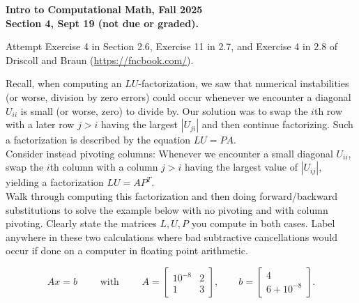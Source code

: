 \documentclass[11pt]{article}
\begin{document}
\begin{center}
{\bf Intro to Computational Math, Fall 2025\\
Section 4, Sept 19 (not due or graded).\\
}
\end{center}


 Attempt Exercise 4 in Section 2.6, Exercise 11 in  2.7, and Exercise 4 in 2.8 of Driscoll and Braun (\url{https://fncbook.com/}).

\vskip1cm

  Recall, when computing an $LU$-factorization, we saw that numerical instabilities (or worse, division by zero errors) could occur whenever we encounter a diagonal $U_{ii}$ is small (or worse, zero) to divide by. Our solution was to swap the $i$th row with a later row $j>i$ having the largest $|U_{ji}|$ and then continue factorizing. Such a factorization is described by the equation $LU = PA$.\\

\noindent Consider instead pivoting columns: Whenever we encounter a small diagonal $U_{ii}$, swap the $i$th column with a column $j>i$ having the largest value of $|U_{ij}|$, yielding a factorization $LU = AP^T$.\\

    Walk through computing this factorization and then doing forward/backward substitutions to solve the example below with no pivoting and with column pivoting.
    Clearly state the matrices $L,U,P$ you compute in both cases.
    Label anywhere in these two calculations where bad subtractive cancellations would occur if done on a computer in floating point arithmetic.
    
    $$ Ax=b \qquad \text{ with } \qquad A = \begin{bmatrix}
        10^{-8} & 2 \\
        1 & 3
    \end{bmatrix},\qquad b = \begin{bmatrix} 4 \\ 6+10^{-8} \end{bmatrix}.
    $$
\end{document}
